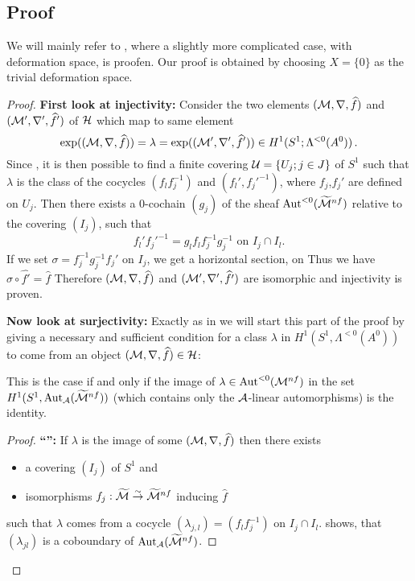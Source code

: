 \subsection{Proof}
We will mainly refer to \cite[section 6.d]{sabbah2007isomonodromic}, where a
slightly more complicated case, with deformation space, is proofen. Our proof is
obtained by choosing $X=\{0\}$ as the trivial deformation space.
\begin{comment}
  See also \cite{BJL1979Birkhoff} and \cite{babbitt1989local} although the proof
  goes back to work from Malgrange and Sibuya (see for example
  \cite{sibuya1990Linear}).
\end{comment}
\begin{proof}
  \textbf{First look at injectivity:}
  Consider the two elements $(\mathcal{M},\nabla,\widehat f)$ and $(\mathcal{M}',\nabla',\widehat f')$
  of $\mathcal{H}$ which map to same element
  \[
    \exp((\mathcal{M},\nabla,\widehat f))=\lambda=\exp((\mathcal{M}',\nabla',\widehat f'))
      \in H^1(S^1;\Lambda^{<0}(A^0)) \,.
  \]
  Since \TODO{}, it is then possible to find a finite covering
  $\mathcal{U}=\{U_j;j\in J\}$ of $S^1$ such that $\lambda$ is the class of the
  cocycles $(f_lf_j^{-1})$ and $(f_l',f_j'^{-1})$, where $f_j$,$f_j'$ are
  defined on $U_j$.
  Then there exists \TODO{} a $0$-cochain $(g_j)$ of the sheaf
  $\operatorname{Aut}^{<0}(\widetilde{\mathcal{M}}^{nf})$ relative to the covering $(I_j)$, such that
  \[
    f_l'f_j'^{-1}=g_lf_lf_j^{-1}g_j^{-1} \text{ on } I_j\cap I_l.
  \]
  If we set $\sigma=f_j^{-1}g_{j}^{-1}f_j'$ on $I_{j}$, we get a horizontal
  section, on \TODO{}
  Thus we have $\sigma\circ\hat{f'}=\hat f$ Therefore $(\mathcal{M},\nabla,\widehat f)$ and
  $(\mathcal{M}',\nabla',\widehat{f'})$ are isomorphic and injectivity is proven.

  \textbf{Now look at surjectivity:}
  Exactly as in \cite{sabbah2007isomonodromic} we will start this part of the proof by giving a
  necessary and sufficient condition for a class $\lambda$ in
  $H^1(S^1,\Lambda^{<0}(A^0))$
  \TODO[$\Lambda^{<0}(A^0)\hat{=}\Aut^{<0}(\tilde\cM^{nf})$ or
  $\Aut^{<0}(\cM^{nf})$?]
  to come from an object
  $(\mathcal{M},\nabla,\widehat f)\in\mathcal{H}$:
  \begin{einr}
    This is the case if and only if the image of
    $\lambda\in\operatorname{Aut}^{<0}(\mathcal{M}^{nf})$ in the set
    $H^1(S^1,\operatorname{Aut}_{\mathcal{A}}(\widetilde{\mathcal{M}}^{nf}))$ (which contains only the
    $\mathcal{A}$-linear automorphisms) is the identity.
  \end{einr}
  \begin{proof}
    \textbf{``\Rightarrow{}'':}
    If $\lambda$ is the image of some $(\mathcal{M},\nabla,\widehat f)$ then there exists
    \begin{itemize}
      \item a covering $(I_{j})$ of $S^1$ and
      \item isomorphisms $f_j:\widetilde{\mathcal{M}}\overset{\sim}\to\widetilde{\mathcal{M}}^{nf}$
        inducing $\hat f$
    \end{itemize}
    such that $\lambda$ comes from a cocycle $(\lambda_{j,l})=(f_lf_j^{-1})$ on
    $I_j\cap I_l$.
    \TODO{} shows, that $(\lambda_{jl})$ is a coboundary of
    $\operatorname{Aut}_\mathcal{A}(\widetilde{\mathcal{M}}^{nf})$.


\end{proof}
\end{proof}
